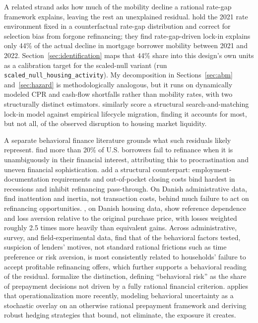\documentclass[12pt]{article}
\begin{document}
A related strand asks how much of the mobility decline a rational rate-gap framework explains, leaving the rest an unexplained residual. \citet{aladangady2024} hold the 2021 rate environment fixed in a counterfactual rate-gap distribution and correct for selection bias from forgone refinancing; they find rate-gap-driven lock-in explains only 44\% of the actual decline in mortgage borrower mobility between 2021 and 2022. Section~\ref{sec:identification} maps that 44\% share into this design's own units as a calibration target for the scaled-null variant (run \texttt{scaled\_null\_housing\_activity}). My decomposition in Sections~\ref{sec:abm} and~\ref{sec:hazard} is methodologically analogous, but it runs on dynamically modeled CPR and cash-flow shortfalls rather than mobility rates, with two structurally distinct estimators. \citet{gerardi2024} similarly score a structural search-and-matching lock-in model against empirical lifecycle migration, finding it accounts for most, but not all, of the observed disruption to housing market liquidity.

A separate behavioral finance literature grounds what such residuals likely represent. \citet{keys2016} find more than 20\% of U.S. borrowers fail to refinance when it is unambiguously in their financial interest, attributing this to procrastination and uneven financial sophistication. \citet{defusco2020} add a structural counterpart: employment-documentation requirements and out-of-pocket closing costs bind hardest in recessions and inhibit refinancing pass-through. On Danish administrative data, \citet{andersen2020} find inattention and inertia, not transaction costs, behind much failure to act on refinancing opportunities. \citet{andersen2022}, on Danish housing data, show reference dependence and loss aversion relative to the original purchase price, with losses weighted roughly 2.5 times more heavily than equivalent gains. Across administrative, survey, and field-experimental data, \citet{johnson2019} find that of the behavioral factors tested, suspicion of lenders' motives, not standard rational frictions such as time preference or risk aversion, is most consistently related to households' failure to accept profitable refinancing offers, which further supports a behavioral reading of the residual. \citet{bissiri2014} formalize the distinction, defining ``behavioral risk'' as the share of prepayment decisions not driven by a fully rational financial criterion. \citet{perotti2024} applies that operationalization more recently, modeling behavioral uncertainty as a stochastic overlay on an otherwise rational prepayment framework and deriving robust hedging strategies that bound, not eliminate, the exposure it creates.
\end{document}
